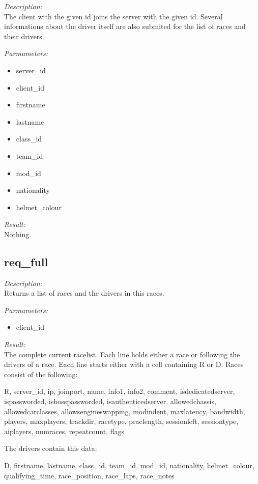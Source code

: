 \begin{description}
\item {\it Description:}\\
The client with the given id joins the server with the given id. Several informations about the driver itself are also submited for the list of races and their drivers.
\item {\it Parmameters:}
\begin{itemize}
\item server\_id
\item client\_id
\item firstname
\item lastname
\item class\_id
\item team\_id
\item mod\_id
\item nationality
\item helmet\_colour
\end{itemize}
\item {\it Result:}\\
Nothing.
\end{description}

\subsection{req\_full}

\begin{description}
\item {\it Description:}\\
Returns a list of races and the drivers in this races.
\item {\it Parmameters:}
\begin{itemize}
\item client\_id
\end{itemize}
\item {\it Result:}\\
The complete current racelist. Each line holds either a race or following the drivers of a race. Each line starts either with a cell containing R or D. Races consist of the following: 
				
			R, 
			server\_id, 
			ip, 
			joinport, 
			name, 
			info1, 
			info2, 
			comment, 
			isdedicatedserver, 
			ispassworded, 
			isbosspassworded, 
			isauthenticedserver, 
			allowedchassis, 
			allowedcarclasses, 
			allowsengineswapping, 
			modindent, 
			maxlatency, 
			bandwidth, 
			players,
			maxplayers, 
			trackdir, 
			racetype, 
			praclength, 
			sessionleft, 
			sessiontype,
			aiplayers,
			numraces,
			repeatcount,
			flags


			The drivers contain this data:

			D,
			firstname,
			lastname,
			class\_id,
			team\_id,
			mod\_id,
			nationality,
			helmet\_colour,
			qualifying\_time,
			race\_position,
			race\_laps,
			race\_notes
			
\end{description}

